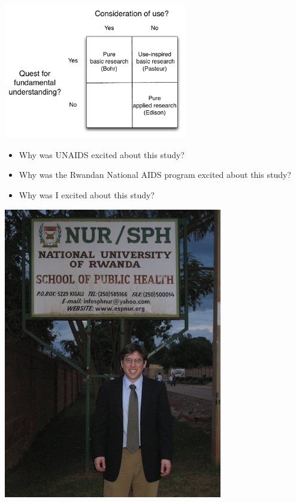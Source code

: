 \documentclass[aspectratio=169]{beamer}
\begin{document}
\begin{frame}

\begin{center}
\includegraphics[width=0.6\textwidth]{figures/pasteurs_quadrant}
\end{center}

\end{frame}
\begin{frame}

\begin{itemize}
\item Why was UNAIDS excited about this study?
\pause
\item Why was the Rwandan National AIDS program excited about this study?
\pause
\item Why was I excited about this study?
\end{itemize}


\end{frame}
\begin{frame}

\begin{center}
\includegraphics[height=0.9\textheight]{figures/rwanda_matt_nur.jpg}
\end{center}

\end{frame}
\end{document}
